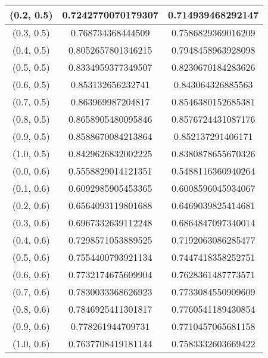 \begin{table}[H]
\begin{tabular}{|c|c|c|}
(0.2, 0.5) & 0.7242770070179307 & 0.714939468292147 \\
\hline
(0.3, 0.5) & 0.768734368444509 & 0.7586829369016209 \\
\hline
(0.4, 0.5) & 0.8052657801346215 & 0.7948458963928098 \\
\hline
(0.5, 0.5) & 0.8334959377349507 & 0.8230670184283626 \\
\hline
(0.6, 0.5) & 0.853132656232741 & 0.843064326885563 \\
\hline
(0.7, 0.5) & 0.863969987204817 & 0.8546380152685381 \\
\hline
(0.8, 0.5) & 0.8658905480095846 & 0.8576724431087176 \\
\hline
(0.9, 0.5) & 0.8588670084213864 & 0.852137291406171 \\
\hline
(1.0, 0.5) & 0.8429626832002225 & 0.8380878655670326 \\
\hline
\hline
(0.0, 0.6) & 0.5558829014121351 & 0.5488116360940264 \\
\hline
(0.1, 0.6) & 0.6092985905453365 & 0.6008596045934067 \\
\hline
(0.2, 0.6) & 0.6564093119801688 & 0.6469039825414681 \\
\hline
(0.3, 0.6) & 0.6967332639112248 & 0.6864847097340014 \\
\hline
(0.4, 0.6) & 0.7298571053889525 & 0.7192063086285477 \\
\hline
(0.5, 0.6) & 0.7554400793921134 & 0.7447418358252751 \\
\hline
(0.6, 0.6) & 0.7732174675609904 & 0.7628361487773571 \\
\hline
(0.7, 0.6) & 0.7830033368626923 & 0.7733084550909609 \\
\hline
(0.8, 0.6) & 0.7846925411301817 & 0.7760541189430854 \\
\hline
(0.9, 0.6) & 0.778261944709731 & 0.7710457065681158 \\
\hline
(1.0, 0.6) & 0.7637708419181144 & 0.7583332603669422 \\
\hline
\end{tabular}
\end{table}

